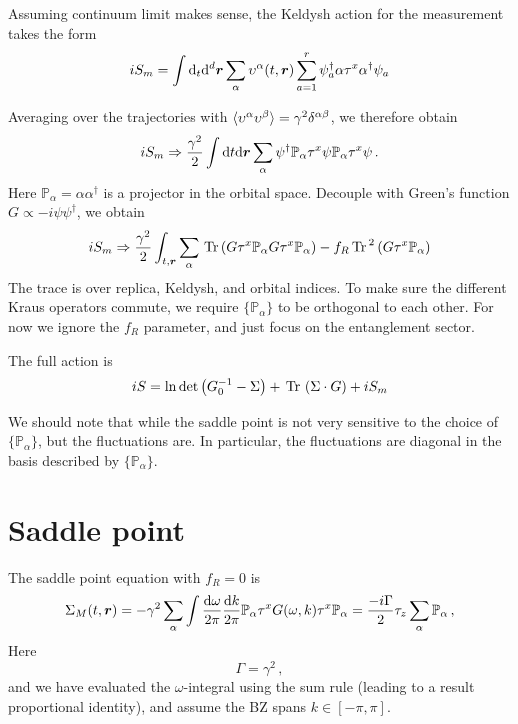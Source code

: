 \documentclass[aps,prx,preprint,amsmath,amssymb]{revtex4-2}
\renewcommand{\vec}[1]{{\boldsymbol{#1}}}
\newcommand{\rd}{{\rm d}}
\newcommand{\Tr}{{\rm \, Tr\,}}
\begin{document}
Assuming continuum limit makes sense, the Keldysh action for the measurement takes the form 
\begin{equation}\label{}
  iS_m=\int\rd_t \rd^d\vec{r} \sum_{\alpha} \upsilon^\alpha(t,\vec{r})\sum_{a=1}^{r} \psi_a^\dagger \alpha \tau^x \alpha^\dagger \psi_a
\end{equation} 

Averaging over the trajectories with $\braket{\upsilon^\alpha \upsilon^\beta}=\gamma^2 \delta^{\alpha\beta}$, we therefore obtain 
\begin{equation}\label{}
  iS_m \Rightarrow \frac{\gamma^2}{2}\int\rd t\rd \vec{r} \sum_{\alpha} \psi^\dagger \mathbb{P}_\alpha \tau^x \psi  \mathbb{P}_\alpha \tau^x \psi\,.
\end{equation} Here $\mathbb{P}_\alpha=\alpha \alpha^\dagger$ is a projector in the orbital space. Decouple with Green's function $G\propto -i \psi \psi^\dagger$, we obtain 
\begin{equation}\label{}
  iS_m \Rightarrow \frac{\gamma^2}{2} \int_{t,\vec{r}} \sum_\alpha\Tr(G \tau^x \mathbb{P}_\alpha G \tau^x \mathbb{P}_\alpha)-f_R \Tr^2\left(G \tau^x \mathbb{P}_\alpha\right)
\end{equation} The trace is over replica, Keldysh, and orbital indices. To make sure the different Kraus operators commute, we require $\{\mathbb{P}_\alpha\}$ to be orthogonal to each other. For now we ignore the $f_R$ parameter, and just focus on the entanglement sector.

The full action is 
\begin{equation}\label{}
  iS = \ln\det\left(G_0^{-1}-\Sigma\right) +\Tr\left(\Sigma\cdot G\right)+i S_m
\end{equation}

We should note that while the saddle point is not very sensitive to the choice of $\{\mathbb{P}_\alpha\}$, but the fluctuations are. In particular, the fluctuations are diagonal in the basis described by $\{\mathbb{P}_\alpha\}$.

\section{Saddle point}

The saddle point equation with $f_R=0$ is 
\begin{equation}\label{}
  \Sigma_M(t,\vec{r})=-\gamma^2 \sum_\alpha\int\frac{\rd \omega}{2\pi}\frac{\rd k}{2\pi} \mathbb{P}_\alpha \tau^x G(\omega,k) \tau^x \mathbb{P}_\alpha =\frac{-i\Gamma}{2} \tau_z \sum_\alpha \mathbb{P}_\alpha\,,
\end{equation} Here
\begin{equation}\label{}
  \Gamma=\gamma^2\,,
\end{equation} and we have evaluated the $\omega$-integral using the sum rule (leading to a result proportional identity), and assume the BZ spans $k\in[-\pi,\pi]$.
\end{document}
